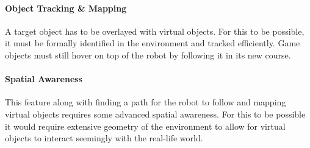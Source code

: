 \paragraph{Object Tracking  \& Mapping}
A target object has to be overlayed with virtual objects. For this to be possible, it must be formally identified in the environment and tracked efficiently. Game objects must still hover on top of the robot by following it in its new course. 

\paragraph{Spatial Awareness}
This feature along with finding a path for the robot to follow and mapping virtual objects requires some advanced spatial awareness. For this to be possible it would require extensive geometry of the environment to allow for virtual objects to interact seemingly with the real-life world. 






